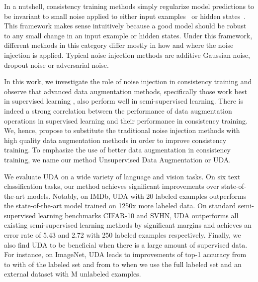 \documentclass{article}
\def\name{UDA\xspace}
\begin{document}
In a nutshell, consistency training methods simply regularize model predictions to be invariant to small noise applied to either input examples~\cite{miyato2018virtual, sajjadi2016regularization, clark2018semi} or hidden states~\cite{bachman2014learning, laine2016temporal}. 
This framework makes sense intuitively because a good model should be robust to any small change in an input example or hidden states.
Under this framework, different methods in this category differ mostly in how and where the noise injection is applied.  Typical noise injection methods are additive Gaussian noise, dropout noise or adversarial noise. 


In this work, we investigate the role of noise injection in consistency training 
and observe that advanced data augmentation methods, specifically those work best in supervised learning \cite{simard1998transformation,krizhevsky2012imagenet,cubuk2018autoaugment,yu2018qanet}, also perform well in semi-supervised learning.
There is indeed a strong correlation between the performance of data augmentation operations in supervised learning and their performance in consistency training. We, hence, propose to substitute the traditional noise injection methods with high quality data augmentation methods in order to improve consistency training.
To emphasize the use of better data augmentation in consistency training, we name our method Unsupervised Data Augmentation or UDA.


We evaluate \name on a wide variety of language and vision tasks. 
On six text classification tasks, our method achieves significant improvements over state-of-the-art models. Notably, on IMDb, \name with 20 labeled examples outperforms the state-of-the-art model trained on 1250x more labeled data. On standard semi-supervised learning benchmarks CIFAR-10 and SVHN, 
UDA outperforms all existing semi-supervised learning methods by significant margins and achieves an error rate of 5.43 and 2.72 with 250 labeled examples respectively. Finally, we also find \name to be beneficial when there is a large amount of supervised data. 
For instance, on ImageNet, \name leads to improvements of top-1 accuracy from  to  with  of the labeled set and from  to  when we use the full labeled set and an external dataset with M unlabeled examples.
\end{document}
